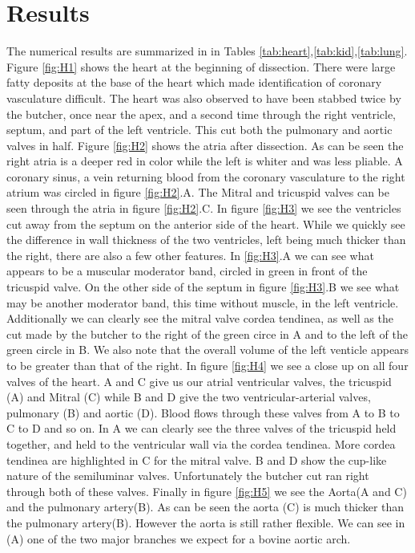 \documentclass[12pt]{article}
\begin{document}
\section{Results}
\par{}
The numerical results are summarized in in Tables \ref{tab:heart},\ref{tab:kid},\ref{tab:lung}. Figure \ref{fig:H1} shows the heart at the beginning of dissection. There were large fatty deposits at the base of the heart which made identification of coronary vasculature difficult. The heart was also observed to have been stabbed twice by the butcher, once near the apex, and a second time through the right ventricle, septum, and part of the left ventricle. This cut both the pulmonary and aortic valves in half. Figure \ref{fig:H2} shows the atria after dissection. As can be seen the right atria is a deeper red in color while the left is whiter and was less pliable. A coronary sinus, a vein returning blood from the coronary vasculature to the right atrium was circled in figure \ref{fig:H2}.A. The Mitral and tricuspid valves can be seen through the atria in figure \ref{fig:H2}.C. In figure \ref{fig:H3} we see the ventricles cut away from the septum on the anterior side of the heart. While we quickly see the difference in wall thickness of the two ventricles, left being much thicker than the right, there are also a few other features. In \ref{fig:H3}.A we can see what appears to be a muscular moderator band, circled in green in front of the tricuspid valve. On the other side of the septum in figure \ref{fig:H3}.B we see what may be another moderator band, this time without muscle, in the left ventricle. Additionally we can clearly see the mitral valve cordea tendinea, as well as the cut made by the butcher to the right of the green circe in A and to the left of the green circle in B. We also note that the overall volume of the left venticle appears to be greater than that of the right. In figure \ref{fig:H4} we see a close up on all four valves of the heart. A and C give us our atrial ventricular valves, the tricuspid (A) and Mitral (C) while B and D give the two ventricular-arterial valves, pulmonary (B) and aortic (D). Blood flows through these valves from A to B to C to D and so on. In A we can clearly see the three valves of the tricuspid held together, and held to the ventricular wall via the cordea tendinea. More cordea tendinea are highlighted in C for the mitral valve. B and D show the cup-like nature of the semiluminar valves. Unfortunately the butcher cut ran right through both of these valves. Finally in figure \ref{fig:H5} we see the Aorta(A and C) and the pulmonary artery(B). As can be seen the aorta (C) is much thicker than the pulmonary artery(B). However the aorta is still rather flexible. We can see in (A) one of the two major branches we expect for a bovine aortic arch.
\end{document}
